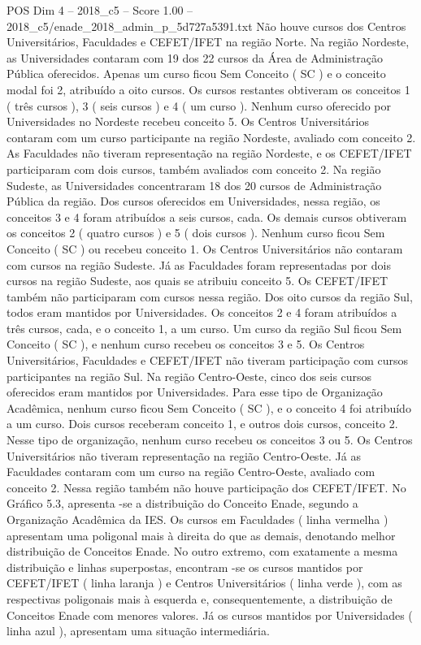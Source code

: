 \begin{textsample}{POS Dim 4 – 2018\_c5 – Score 1.00 – 2018\_c5/enade\_2018\_admin\_p\_5d727a5391.txt}
Não houve cursos dos Centros Universitários, Faculdades e CEFET/IFET na região Norte.
Na região Nordeste, as Universidades contaram com 19 dos 22 cursos da Área de Administração Pública oferecidos.
Apenas um curso ficou Sem Conceito ( SC ) e o conceito modal foi 2, atribuído a oito cursos.
Os cursos restantes obtiveram os conceitos 1 ( três cursos ), 3 ( seis cursos ) e 4 ( um curso ).
Nenhum curso oferecido por Universidades no Nordeste recebeu conceito 5.
Os Centros Universitários contaram com um curso participante na região Nordeste, avaliado com conceito 2.
As Faculdades não tiveram representação na região Nordeste, e os CEFET/IFET participaram com dois cursos, também avaliados com conceito 2.
Na região Sudeste, as Universidades concentraram 18 dos 20 cursos de Administração Pública da região.
Dos cursos oferecidos em Universidades, nessa região, os conceitos 3 e 4 foram atribuídos a seis cursos, cada.
Os demais cursos obtiveram os conceitos 2 ( quatro cursos ) e 5 ( dois cursos ).
Nenhum curso ficou Sem Conceito ( SC ) ou recebeu conceito 1.
Os Centros Universitários não contaram com cursos na região Sudeste.
Já as Faculdades foram representadas por dois cursos na região Sudeste, aos quais se atribuiu conceito 5.
Os CEFET/IFET também não participaram com cursos nessa região.
Dos oito cursos da região Sul, todos eram mantidos por Universidades.
Os conceitos 2 e 4 foram atribuídos a três cursos, cada, e o conceito 1, a um curso.
Um curso da região Sul ficou Sem Conceito ( SC ), e nenhum curso recebeu os conceitos 3 e 5.
Os Centros Universitários, Faculdades e CEFET/IFET não tiveram participação com cursos participantes na região Sul.
Na região Centro-Oeste, cinco dos seis cursos oferecidos eram mantidos por Universidades.
Para esse tipo de Organização Acadêmica, nenhum curso ficou Sem Conceito ( SC ), e o conceito 4 foi atribuído a um curso.
Dois cursos receberam conceito 1, e outros dois cursos, conceito 2.
Nesse tipo de organização, nenhum curso recebeu os conceitos 3 ou 5.
Os Centros Universitários não tiveram representação na região Centro-Oeste.
Já as Faculdades contaram com um curso na região Centro-Oeste, avaliado com conceito 2.
Nessa região também não houve participação dos CEFET/IFET.
No Gráfico 5.3, apresenta -se a distribuição do Conceito Enade, segundo a Organização Acadêmica da IES.
Os cursos em Faculdades ( linha vermelha ) apresentam uma poligonal mais à direita do que as demais, denotando melhor distribuição de Conceitos Enade.
No outro extremo, com exatamente a mesma distribuição e linhas superpostas, encontram -se os cursos mantidos por CEFET/IFET ( linha laranja ) e Centros Universitários ( linha verde ), com as respectivas poligonais mais à esquerda e, consequentemente, a distribuição de Conceitos Enade com menores valores.
Já os cursos mantidos por Universidades ( linha azul ), apresentam uma situação intermediária.

\end{textsample}
